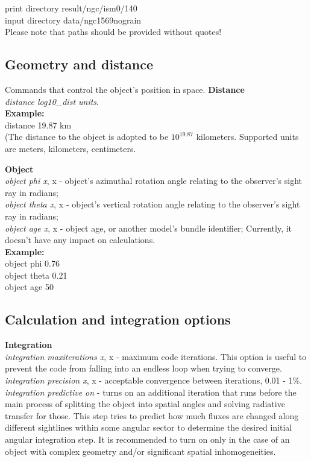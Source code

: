 \documentclass[a4paper]{article}
\begin{document}
\hspace*{1cm} print directory result/ngc/ism0/140 \\

\hspace*{1cm} input directory data/ngc1569nograin \\
Please note that paths should be provided without quotes!\\

\subsection{Geometry and distance}
Commands that control the object's position in space.
    {\bf Distance}\\
    {\it distance log10\_dist units}.\\

    {\bf Example:}\\
distance 19.87 km \\
(The distance to the object is adopted to be $10^{19.87}$ kilometers.
Supported units are meters, kilometers, centimeters.

    {\bf Object}\\
    {\it object phi x}, x - object's azimuthal rotation angle relating to the observer's sight ray in radians;\\
    {\it object theta x}, x - object's vertical rotation angle relating to the observer's sight ray in radians;\\
    {\it object age x}, x - object age, or another model's bundle identifier; Currently, it doesn't have any impact on calculations.\\

    {\bf Example:}\\
object phi 0.76\\
object theta 0.21\\
object age 50\\

\subsection{Calculation and integration options}
{\bf Integration}\\
    {\it integration maxiterations x}, x - maximum code iterations.
This option is useful to prevent the code from falling into an endless loop when trying to converge.\\
    {\it integration precision x}, x - acceptable convergence between iterations, 0.01 - 1\%. \\
    {\it integration predictive on} - turns on an additional iteration that runs before the main process of splitting the object into spatial angles and solving
radiative transfer for those.
This step tries to predict how much fluxes are changed along different sightlines within some angular sector
to determine the desired initial angular integration step.
It is recommended to turn on only in the case of an object with complex geometry and/or
significant spatial inhomogeneities.
\end{document}
